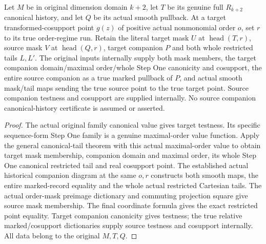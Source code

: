 \begin{theorem}
\label{hir:smooth-original-general-canonical-companion-diagram}
\leanok
{}
Let $M$ be in original dimension domain $k+2$, let $T$ be its genuine
full $R_{k+2}$ canonical history, and let $Q$ be its actual smooth pullback.
At a target transformed-cosupport point $g(z)$ of positive actual
nonmonomial order $o$, set $r$ to its true order-regime run.  Retain the
literal target mask $U$ at $\operatorname{head}(T,r)$, source mask $V$ at
$\operatorname{head}(Q,r)$, target companion $P$ and both whole restricted
tails $L,L'$.  The original inputs internally supply both mask members,
the target companion domain/maximal order/whole Step One canonicity and
cosupport, the entire source companion as a true marked pullback of $P$,
and actual smooth mask/tail maps sending the true source point to the true
target point.  Source companion testness and cosupport are supplied internally.
No source companion canonical-history certificate is assumed or asserted.
\end{theorem}
\begin{proof}
The actual original family canonical value gives target testness.  Its
specific sequence-form Step One family is a genuine maximal-order value function.  Apply
the general canonical-tail theorem with this actual maximal-order value to obtain target
mask membership, companion domain and maximal order, its whole Step One
canonical restricted tail and real cosupport point.  The established actual
historical companion diagram at the same $o,r$ constructs both smooth maps,
the entire marked-record equality and the whole actual restricted Cartesian
tails.  The actual order-mask preimage dictionary and commuting projection
square give source mask membership.  The final coordinate formula gives
the exact restricted point equality.  Target companion canonicity gives
testness; the true relative marked/cosupport dictionaries supply source
testness and cosupport internally.  All data belong to the original $M,T,Q$.
\end{proof}

